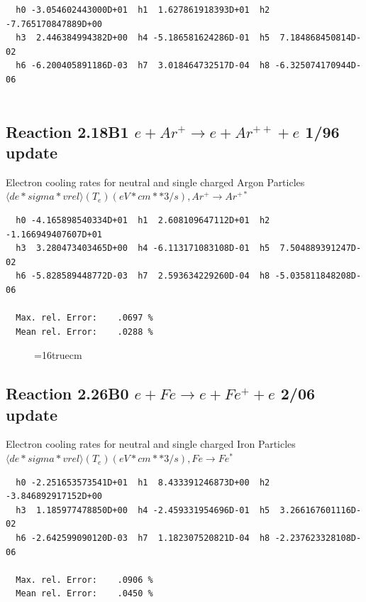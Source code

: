 \documentclass[12pt,dvips]{article}
\begin{document}
\begin{small}\begin{verbatim}
  h0 -3.054602443000D+01  h1  1.627861918393D+01  h2 -7.765170847889D+00
  h3  2.446384994382D+00  h4 -5.186581624286D-01  h5  7.184868450814D-02
  h6 -6.200405891186D-03  h7  3.018464732517D-04  h8 -6.325074170944D-06


\end{verbatim}\end{small}


\subsection{
Reaction 2.18B1 $e + Ar^+ \rightarrow e + Ar^{++} + e$ 1/96 update
}

  Electron cooling rates for neutral and single
  charged Argon Particles
 $  \langle de*sigma*vrel \rangle(T_e)  (eV*cm**3/s), Ar^+ \rightarrow Ar^{+*} $

\begin{small}\begin{verbatim}
  h0 -4.165898540334D+01  h1  2.608109647112D+01  h2 -1.166949407607D+01
  h3  3.280473403465D+00  h4 -6.113171083108D-01  h5  7.504889391247D-02
  h6 -5.828589448772D-03  h7  2.593634229260D-04  h8 -5.035811848208D-06

  Max. rel. Error:    .0697 %
  Mean rel. Error:    .0288 %

\end{verbatim}\end{small}

\begin{figure} \label{2.18Bl}
\epsfxsize=16truecm
\end{figure}
\newpage


\subsection{
Reaction 2.26B0 $e + Fe  \rightarrow e + Fe^+  + e$ 2/06 update
}

  Electron cooling rates for neutral and single
  charged Iron Particles
 $ \langle de*sigma*vrel \rangle(T_e)  (eV*cm**3/s), Fe  \rightarrow Fe^* $

\begin{small}\begin{verbatim}
  h0 -2.251653573541D+01  h1  8.433391246873D+00  h2 -3.846892917152D+00
  h3  1.185977478850D+00  h4 -2.459331954696D-01  h5  3.266167601116D-02
  h6 -2.642599090120D-03  h7  1.182307520821D-04  h8 -2.237623328108D-06

  Max. rel. Error:    .0906 %
  Mean rel. Error:    .0450 %

\end{verbatim}\end{small}
\end{document}
